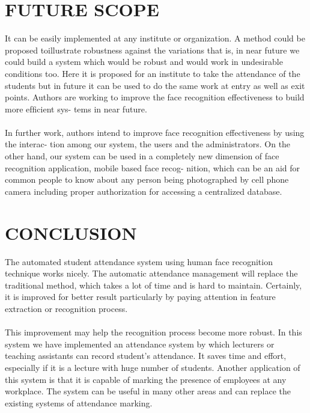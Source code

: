 \documentclass[a4paper, 12pt]{report}
\begin{document}
\section{FUTURE SCOPE}
It can be easily implemented at any institute or organization. A method could be proposed toillustrate robustness against the variations that is, in near future we could build a system which would be robust and would work in undesirable conditions too. Here it is proposed for an institute to take the attendance of the students but in future it can be used to do the same work at entry as well as exit points. Authors are working to improve the face recognition effectiveness to build more efﬁcient sys- tems in near future.\paragraph{} In further work, authors intend to improve face recognition effectiveness by using the interac- tion among our system, the users and the administrators. On the other hand, our system can be used in a completely new dimension of face recognition application, mobile based face recog- nition, which can be an aid for common people to know about any person being photographed by cell phone camera including proper authorization for accessing a centralized database.

\newpage
\section{CONCLUSION}
The automated student attendance system using human face recognition technique works
nicely. The automatic attendance management will replace the traditional method, which takes
a lot of time and is hard to maintain. Certainly, it is improved for better result particularly by
paying attention in feature extraction or recognition process.\paragraph{}

This improvement may help the recognition process become more robust. In this system
we have implemented an attendance system by which lecturers or teaching assistants can record
student’s attendance. It saves time and effort, especially if it is a lecture with huge number of
students. Another application of this system is that it is capable of marking the presence of
employees at any workplace. The system can be useful in many other areas and can replace the
existing systems of attendance marking.\paragraph{}
\end{document}
